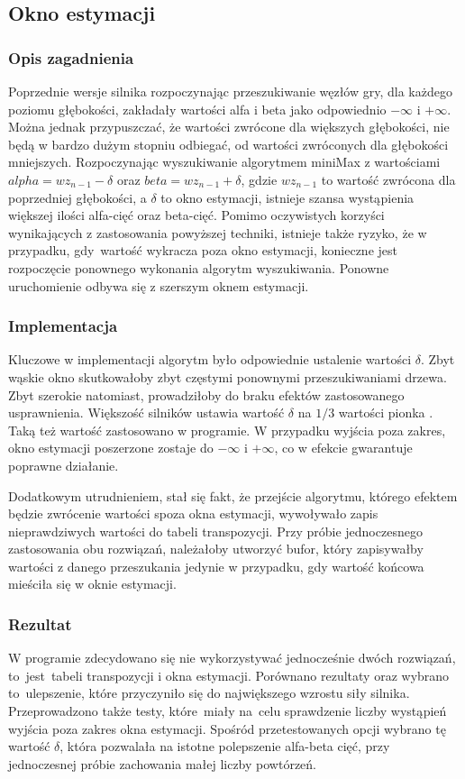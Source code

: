 \subsection{Okno estymacji}
\label{subsec:okno-estymacji}

\subsubsection{Opis zagadnienia}
Poprzednie wersje silnika rozpoczynając przeszukiwanie węzłów gry, dla każdego poziomu głębokości, zakładały wartości alfa i beta jako odpowiednio $-\infty$ i $+\infty$.
Można jednak przypuszczać, że wartości zwrócone dla większych głębokości, nie będą w bardzo dużym stopniu odbiegać, od wartości zwróconych dla głębokości mniejszych.
Rozpoczynając wyszukiwanie algorytmem miniMax z wartościami $alpha = wz_{n-1} - \delta$ oraz $beta = wz_{n-1} + \delta$, gdzie $wz_{n-1}$ to wartość zwrócona dla poprzedniej głębokości, a $\delta$ to okno estymacji, istnieje szansa wystąpienia większej ilości alfa-cięć oraz beta-cięć.
Pomimo oczywistych korzyści wynikających z zastosowania powyższej techniki, istnieje także ryzyko, że w przypadku, gdy~wartość wykracza poza okno estymacji, konieczne jest rozpoczęcie ponownego wykonania algorytm wyszukiwania.
Ponowne uruchomienie odbywa się z szerszym oknem estymacji.

\subsubsection{Implementacja}
Kluczowe w implementacji algorytm było odpowiednie ustalenie wartości $\delta$.
Zbyt wąskie okno skutkowałoby zbyt częstymi ponownymi przeszukiwaniami drzewa.
Zbyt szerokie natomiast, prowadziłoby do braku efektów zastosowanego usprawnienia.
Większość silników ustawia wartość $\delta$ na $1/3$ wartości pionka \cite*{duch}.
Taką też wartość zastosowano w programie.
W przypadku wyjścia poza zakres, okno estymacji poszerzone zostaje do $-\infty$ i $+\infty$, co w efekcie gwarantuje poprawne działanie.

Dodatkowym utrudnieniem, stał się fakt, że przejście algorytmu, którego efektem będzie zwrócenie wartości spoza okna estymacji, wywoływało zapis nieprawdziwych wartości do tabeli transpozycji.
Przy próbie jednoczesnego zastosowania obu rozwiązań, należałoby utworzyć bufor, który zapisywałby wartości z danego przeszukania jedynie w przypadku, gdy wartość końcowa mieściła się w oknie estymacji.

\subsubsection{Rezultat}
W programie zdecydowano się nie wykorzystywać jednocześnie dwóch rozwiązań, to~jest~tabeli transpozycji i okna estymacji.
Porównano rezultaty oraz wybrano to~ulepszenie, które przyczyniło się do największego wzrostu siły silnika.
Przeprowadzono także testy, które~miały na~celu sprawdzenie liczby wystąpień wyjścia poza zakres okna estymacji.
Spośród przetestowanych opcji wybrano tę wartość $\delta$, która pozwalała na istotne polepszenie alfa-beta cięć, przy jednoczesnej próbie zachowania małej liczby powtórzeń.